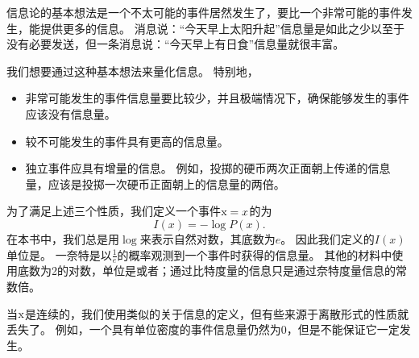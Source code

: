信息论的基本想法是一个不太可能的事件居然发生了，要比一个非常可能的事件发生，能提供更多的信息。
消息说：``今天早上太阳升起''信息量是如此之少以至于没有必要发送，但一条消息说：``今天早上有日食''信息量就很丰富。


我们想要通过这种基本想法来量化信息。
特别地，
\begin{itemize}
\item 非常可能发生的事件信息量要比较少，并且极端情况下，确保能够发生的事件应该没有信息量。

\item 较不可能发生的事件具有更高的信息量。

\item 独立事件应具有增量的信息。
例如，投掷的硬币两次正面朝上传递的信息量，应该是投掷一次硬币正面朝上的信息量的两倍。
\end{itemize}

为了满足上述三个性质，我们定义一个事件$\mathrm{x} = x$的为
\begin{equation}
I(x) = -\log P(x).
\end{equation}
在本书中，我们总是用$\log$来表示自然对数，其底数为$e$。
因此我们定义的$I(x)$单位是。
一奈特是以$\frac{1}{e}$的概率观测到一个事件时获得的信息量。
其他的材料中使用底数为2的对数，单位是或者；通过比特度量的信息只是通过奈特度量信息的常数倍。

当$\mathrm{x}$是连续的，我们使用类似的关于信息的定义，但有些来源于离散形式的性质就丢失了。
例如，一个具有单位密度的事件信息量仍然为0，但是不能保证它一定发生。

